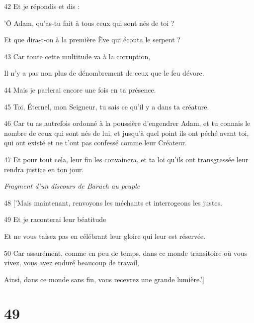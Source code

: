 \par 42 Et je répondis et dis :

\par 'Ô Adam, qu'as-tu fait à tous ceux qui sont nés de toi ?

\par Et que dira-t-on à la première Ève qui écouta le serpent ?

\par 43 Car toute cette multitude va à la corruption,

\par Il n'y a pas non plus de dénombrement de ceux que le feu dévore.

\par 44 Mais je parlerai encore une fois en ta présence.

\par 45 Toi, Éternel, mon Seigneur, tu sais ce qu'il y a dans ta créature.

\par 46 Car tu as autrefois ordonné à la poussière d'engendrer Adam, et tu connais le nombre de ceux qui sont nés de lui, et jusqu'à quel point ils ont péché avant toi, qui ont existé et ne t'ont pas confessé comme leur Créateur.

\par 47 Et pour tout cela, leur fin les convaincra, et ta loi qu'ils ont transgressée leur rendra justice en ton jour.

\par \textit{Fragment d'un discours de Baruch au peuple}

\par 48 ['Mais maintenant, renvoyons les méchants et interrogeons les justes.

\par 49 Et je raconterai leur béatitude

\par Et ne vous taisez pas en célébrant leur gloire qui leur est réservée.

\par 50 Car assurément, comme en peu de temps, dans ce monde transitoire où vous vivez, vous avez enduré beaucoup de travail,

\par Ainsi, dans ce monde sans fin, vous recevrez une grande lumière.']

\chapter{49}

